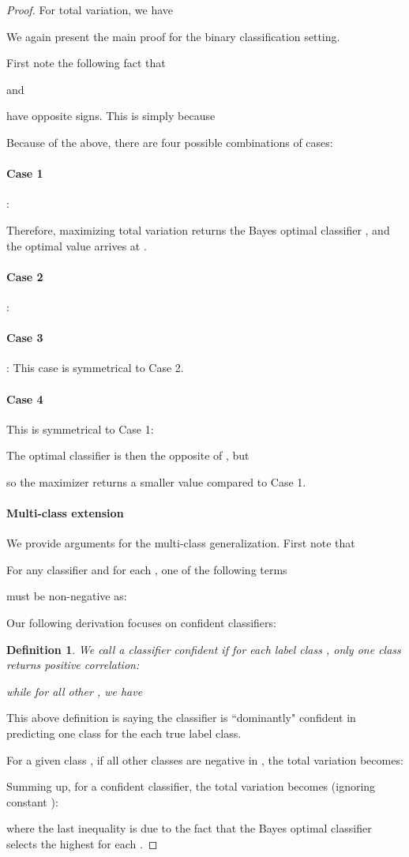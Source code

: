 \documentclass{article}
\newtheorem{definition}{Definition}
\begin{document}
\begin{proof}
For total variation, we have

We again present the main proof for the binary classification setting.

First note the following fact that

    and
    
have opposite signs. This is simply because 

Because of the above, there are four possible combinations of cases:
\paragraph{Case 1} :

Therefore, maximizing  total variation returns the Bayes optimal classifier , and the optimal value arrives at .

\paragraph{Case 2} : 

    
\paragraph{Case 3}
: This case is symmetrical to Case 2. 

\paragraph{Case 4}
This is symmetrical to Case 1:

 The optimal classifier is then the opposite of , but
 
 so the maximizer returns a smaller value compared to Case 1.
 
 
 \paragraph{Multi-class extension}
We provide arguments for the multi-class generalization. First note that
 
For any classifier  and for each , one of the following terms 
 
 must be non-negative as:
 
 
Our following derivation focuses on confident classifiers:
 \begin{definition}
 We call a classifier confident if for each label class , only one class  returns positive correlation:
 
 while for all other , we have

 \end{definition}
 This above definition is saying the classifier  is ``dominantly" confident in predicting one class for the each true label class.
 
For a given class , if all other classes  are negative in  , the total variation becomes:

Summing up, for a confident classifier, the total variation becomes (ignoring constant ):

where the last inequality is due to the fact that the Bayes optimal classifier selects the highest  for each .

\end{proof}
\end{document}
